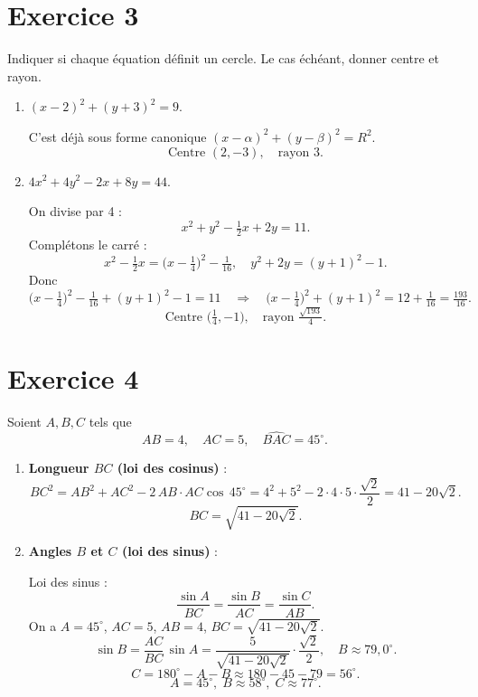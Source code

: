 \documentclass{article}
\theoremstyle{definition}
\begin{document}
\section*{Exercice 3}
Indiquer si chaque équation définit un cercle. Le cas échéant, donner centre et rayon.
\begin{enumerate}
  \item $(x-2)^2 + (y+3)^2 = 9$.

    C’est déjà sous forme canonique $(x-\alpha)^2+(y-\beta)^2=R^2$.
    \[
      \boxed{\text{Centre }(2,-3),\quad \text{rayon }3.}
    \]

  \item $4x^2 + 4y^2 -2x +8y = 44$.

    On divise par 4 :
    \[
      x^2 + y^2 - \tfrac12 x +2y = 11.
    \]
    Complétons le carré :
    \[
      x^2 - \tfrac12 x = \bigl(x - \tfrac14\bigr)^2 - \tfrac1{16},
      \quad
      y^2 + 2y = (y+1)^2 -1.
    \]
    Donc
    \[
      \bigl(x - \tfrac14\bigr)^2 -\tfrac1{16}
      + (y+1)^2 -1 = 11
      \quad\Longrightarrow\quad
      \bigl(x - \tfrac14\bigr)^2 + (y+1)^2 = 12 + \tfrac1{16}
      = \tfrac{193}{16}.
    \]
    \[
      \boxed{\text{Centre }\bigl(\tfrac14,-1\bigr),\quad
      \text{rayon }\tfrac{\sqrt{193}}4.}
    \]
\end{enumerate}

\section*{Exercice 4}
Soient $A,B,C$ tels que
\[
  AB=4,\quad AC=5,\quad \widehat{BAC}=45^\circ.
\]
\begin{enumerate}
  \item {\bf Longueur $BC$ (loi des cosinus)} :
    \[
      BC^2 = AB^2 + AC^2 -2\,AB\cdot AC\cos\,45^\circ
      = 4^2 +5^2 -2\cdot4\cdot5\cdot\frac{\sqrt2}{2}
      = 41 -20\sqrt2.
    \]
    \[
      \boxed{BC = \sqrt{41 -20\sqrt2}.}
    \]

  \item {\bf Angles $B$ et $C$ (loi des sinus)} :

    Loi des sinus :
    \[
      \frac{\sin A}{BC} = \frac{\sin B}{AC} = \frac{\sin C}{AB}.
    \]
    On a $A=45^\circ$, $AC=5$, $AB=4$, $BC=\sqrt{41-20\sqrt2}$.  
    \[
      \sin B = \frac{AC}{BC}\,\sin A
      = \frac{5}{\sqrt{41-20\sqrt2}}\cdot\frac{\sqrt2}{2},
      \quad B\approx79{,}0^\circ.
    \]
    \[
      C = 180^\circ - A - B \approx 180 -45 -79 = 56^\circ.
    \]
    \[
      \boxed{A=45^\circ,\;B\approx58^\circ,\;C\approx77^\circ.}
    \]
\end{enumerate}
\end{document}
